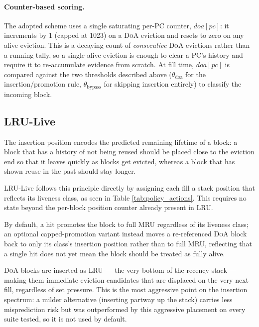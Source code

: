 \documentclass[conference]{IEEEtran}
\newcommand{\lru}{\textsc{LRU}\xspace}
\newcommand{\doa}{\textsc{DoA}\xspace}
\begin{document}
\paragraph{Counter-based scoring.}
The adopted scheme uses a single saturating per-\textsc{PC} counter,
$\mathit{doa}[pc]$: it increments by 1 (capped at 1023) on a \doa eviction and
resets to zero on any alive eviction. This is a decaying count of
\emph{consecutive} \doa evictions rather than a running tally, so a single
alive eviction is enough to clear a \textsc{PC}'s history and require it to
re-accumulate evidence from scratch. At fill time, $\mathit{doa}[pc]$ is
compared against the two thresholds described above ($\theta_{\mathrm{doa}}$
for the insertion/promotion rule, $\theta_{\mathrm{bypass}}$ for skipping
insertion entirely) to classify the incoming block.

\subsection{LRU-Live}

The insertion position encodes the predicted remaining lifetime of a block:
a block that has a history of not being reused should be placed close to the
eviction end so that it leaves quickly as blocks get evicted, whereas a block
that has shown reuse in the past should stay longer.


\lru-Live follows this principle directly by assigning each fill a stack position
that reflects its liveness class, as seen in Table \ref{tab:policy_actions}.
This requires no state beyond the per-block position counter already present in \lru.

By default, a hit promotes the block to full \textsc{MRU} regardless of its
liveness class; an optional capped-promotion variant instead moves a
re-referenced \doa block back to only its class's insertion position rather
than to full \textsc{MRU}, reflecting that a single hit does not yet mean the
block should be treated as fully alive.

\doa blocks are inserted as LRU --- the very bottom of the recency stack ---
making them immediate eviction candidates that are displaced on the very next
fill, regardless of set pressure. This is the most aggressive point on the
insertion spectrum: a milder alternative (inserting partway up the stack)
carries less misprediction risk but was outperformed by this aggressive
placement on every suite tested, so it is not used by default.
\end{document}
